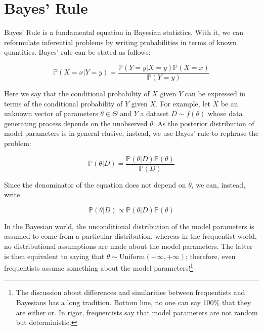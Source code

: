\documentclass[]{book}
\begin{document}
\hypertarget{bayes-rule}{%
\chapter{Bayes' Rule}\label{bayes-rule}}

Bayes' Rule is a fundamental equation in Bayesian statistics. With it, we can reformulate inferential problems by writing probabilities in terms of known quantities. Bayes' rule can be stated as follows:

\begin{equation}
\mathbb{P}{\left(X=x|Y=y\right)} = \frac{\mathbb{P}{\left(Y=y|X=y\right)}\mathbb{P}{\left(X=x\right)}}{\mathbb{P}{\left(Y=y\right)}}
\end{equation}

Here we say that the conditional probability of \(X\) given \(Y\) can be expressed in terms of the conditional probability of \(Y\) given \(X\). For example, let \(X\) be an unknown vector of parameters \(\theta\in\Theta\) and \(Y\) a dataset \(D \sim f(\theta)\) whose data generating process depends on the unobserved \(\theta\). As the posterior distribution of model parameters is in general elusive, instead, we use Bayes' rule to rephrase the problem:

\begin{equation*}
\mathbb{P}{\left(\theta|D\right)} = \frac{\mathbb{P}{\left(\theta|D\right)}\mathbb{P}{\left(\theta\right)}}{\mathbb{P}{\left(D\right)}}
\end{equation*}

Since the denominator of the equation does not depend on \(\theta\), we can, instead, write

\begin{equation*}
\mathbb{P}{\left(\theta|D\right)} \propto \mathbb{P}{\left(\theta|D\right)}\mathbb{P}{\left(\theta\right)}
\end{equation*}

In the Bayesian world, the unconditional distribution of the model parameters is assumed to come from a particular distribution, whereas in the frequentist world, no distributional assumptions are made about the model parameters. The latter is then equivalent to saying that \(\theta\sim \mbox{Uniform}(-\infty, +\infty)\); therefore, even frequentists assume something about the model parameters!\footnote{The discussion about differences and similarities between frequentists and Bayesians has a long tradition. Bottom line, no one can say 100\% that they are either or. In rigor, frequentists say that model parameters are not random but deterministic.}
\end{document}
